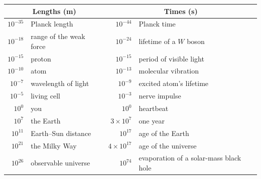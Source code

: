 \begin{center}
\small
\renewcommand{\arraystretch}{1.15}
\begin{tabular}{@{}r l@{\qquad}r l@{}}
\toprule
\multicolumn{2}{c}{\textbf{Lengths (m)}} & \multicolumn{2}{c}{\textbf{Times (s)}}\\
\midrule
$10^{-35}$ & Planck length & $10^{-44}$ & Planck time\\
$10^{-18}$ & range of the weak force & $10^{-24}$ & lifetime of a $W$ boson\\
$10^{-15}$ & proton & $10^{-15}$ & period of visible light\\
$10^{-10}$ & atom & $10^{-13}$ & molecular vibration\\
$10^{-7}$ & wavelength of light & $10^{-9}$ & excited atom's lifetime\\
$10^{-5}$ & living cell & $10^{-3}$ & nerve impulse\\
$10^{0}$ & you & $10^{0}$ & heartbeat\\
$10^{7}$ & the Earth & $3\times10^{7}$ & one year\\
$10^{11}$ & Earth--Sun distance & $10^{17}$ & age of the Earth\\
$10^{21}$ & the Milky Way & $4\times10^{17}$ & age of the universe\\
$10^{26}$ & observable universe & $10^{74}$ & evaporation of a solar-mass black hole\\
\bottomrule
\end{tabular}
\end{center}
